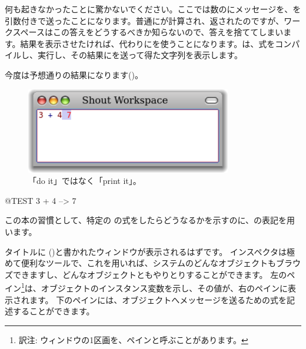 \documentclass[a4paper,10pt,twoside]{book}
\begin{document}
何も起きなかったことに驚かないでください。ここでは数のに\ct{+}メッセージを、を引数付きで送ったことになります。普通にが計算され、返されたのですが、ワークスペースはこの答えをどうするべきか知らないので、答えを捨ててしまいます。結果を表示させたければ、代わりにを使うことになります。は、式をコンパイルし、実行し、その結果にを送って得た文字列を表示します。

今度は予想通りの結果になります()。

\begin{figure}[htb]
\centerline {\includegraphics[width=0.8\textwidth]{PrintIt}}
\caption{「do it」ではなく「print it」。}
\end{figure}

\begin{code}{@TEST}
3 + 4 --> 7
\end{code}
\noindent
この本の習慣として、特定の \pharo の式をしたらどうなるかを示すのに、\ct{-->}の表記を用います。

\noindent
タイトルに ()と書かれたウィンドウが表示されるはずです。
インスペクタは極めて便利なツールで、これを用いれば、システムのどんなオブジェクトもブラウズできますし、どんなオブジェクトともやりとりすることができます。
左のペイン\footnote{訳注: ウィンドウの1区画を、ペインと呼ぶことがあります。}は、オブジェクトのインスタンス変数を示し、その値が、右のペインに表示されます。
下のペインには、オブジェクトへメッセージを送るための式を記述することができます。
\end{document}
